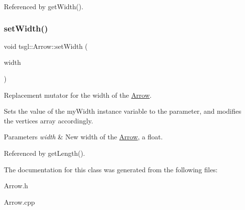 Referenced by get\+Width().

\mbox{\label{classtsgl_1_1_arrow_aea3e79fc0b28a86e6726b1a7c3caabfe}} 
\subsubsection{\texorpdfstring{set\+Width()}{setWidth()}}
{\footnotesize\ttfamily void tsgl\+::\+Arrow\+::set\+Width (\begin{DoxyParamCaption}\item[{G\+Lfloat}]{width }\end{DoxyParamCaption})}



Replacement mutator for the width of the \hyperlink{classtsgl_1_1_arrow}{Arrow}. 

Sets the value of the my\+Width instance variable to the parameter, and modifies the vertices array accordingly. 
\begin{DoxyParams}{Parameters}
{\em width} & New width of the \hyperlink{classtsgl_1_1_arrow}{Arrow}, a float. \\
\hline
\end{DoxyParams}


Referenced by get\+Length().



The documentation for this class was generated from the following files\+:\begin{DoxyCompactItemize}
\item 
Arrow.\+h\item 
Arrow.\+cpp\end{DoxyCompactItemize}
